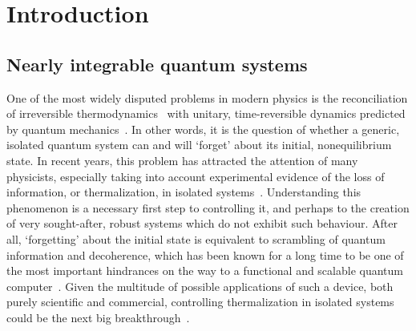 \chapter{Introduction}
\thispagestyle{chapterBeginStyle}

\section{Nearly integrable quantum systems}
One of the most widely disputed problems in modern physics is the reconciliation
of irreversible thermodynamics~\autocite{huang1987statistical,feynman1998statistical}
with unitary, time-reversible dynamics predicted by quantum mechanics~\autocite{Landau1976,Sakurai2017}.
In other words, it is the question of whether a generic, isolated quantum system can and will `forget' about its
initial, nonequilibrium state. In recent years, this problem has attracted the attention of many physicists,
especially taking into account experimental evidence of the loss of information, or thermalization, in isolated
systems~\autocite{Trotzky2012325,Rigol2012,Rigol2008854,Hung2010,Hofferberth2007}. Understanding this phenomenon is a necessary first step to
controlling it, and perhaps to the creation of very sought-after, robust systems which do not exhibit such
behaviour. After all, `forgetting' about the initial state is equivalent to scrambling of quantum information
and decoherence, which has been known for a long time to be one of the most important hindrances on
the way to a functional and scalable quantum computer~\autocite{Shor1995,LewisSwan2019}. Given the multitude
of possible applications of such a device, both purely scientific and commercial, controlling thermalization
in isolated systems could be the next big breakthrough~\autocite{MacQuarrie2020}.
 
